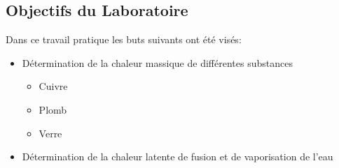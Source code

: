 \subsection*{Objectifs du Laboratoire}
Dans ce travail pratique les buts suivants ont été visés:
\begin{itemize}
    \item{Détermination de la chaleur massique de différentes substances}
	\begin{itemize}
	    \item{Cuivre}
	    \item{Plomb}
	    \item{Verre}
	\end{itemize}
    \item{Détermination de la chaleur latente de fusion et de vaporisation de l'eau}
\end{itemize}
